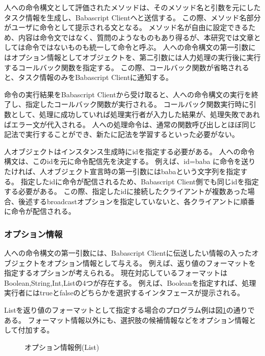 \documentclass[twoside]{wiss}
\begin{document}
人への命令構文として評価されたメソッドは、そのメソッド名と引数を元にしたタスク情報を生成し、Babascript Clientへと送信する。
この際、メソッド名部分がユーザに命令として提示される文となる。
メソッド名が自由に設定できるため、内容は命令文ではなく、質問のようなものもあり得るが、本研究では文章としては命令ではないものも統一して命令と呼ぶ。
人への命令構文の第一引数にはオプション情報としてオブジェクトを、第二引数には人力処理の実行後に実行するコールバック関数を指定する。
この際、コールバック関数が省略されると、タスク情報のみをBabascript Clientに通知する。

命令の実行結果をBabascript Clientから受け取ると、人への命令構文の実行を終了し、指定したコールバック関数が実行される。
コールバック関数実行時に引数として、処理に成功していれば処理実行者が入力した結果が、処理失敗であればエラー文が代入される。
人への処理命令は、通常の関数呼び出しとほぼ同じ記法で実行することができ、新たに記法を学習するといった必要がない。

人オブジェクトはインスタンス生成時にidを指定する必要がある。
人への命令構文は、このidを元に命令配信先を決定する。
例えば、id=baba に命令を送りたければ、人オブジェクト宣言時の第一引数にはbabaという文字列を指定する。
指定したidに命令が配信されるため、Babascript Client側でも同じidを指定する必要がある。
この際、指定したidに接続したクライアントが複数あった場合、後述するbroadcastオプションを指定していないと、各クライアントに順番に命令が配信される。
  
\subsubsection{オプション情報}
人への命令構文の第一引数には、Babascript Clientに伝送したい情報の入ったオブジェクトをオプション情報として与える。
例えば、返り値のフォーマットを指定するオプションが考えられる。
現在対応しているフォーマットはBoolean,String,Int,Listの4つが存在する。
例えば、Booleanを指定すれば、処理実行者にはtrueとfalseのどちらかを選択するインタフェースが提示される。

Listを返り値のフォーマットとして指定する場合のプログラム例は図\ref{script_02}の通りである。
フォーマット情報以外にも、選択肢の候補情報などをオプション情報として付加する。

\begin{figure}[!h]  
  \centering
  \caption{オプション情報例(List)}
  \label{script_02}
\end{figure}
\end{document}

